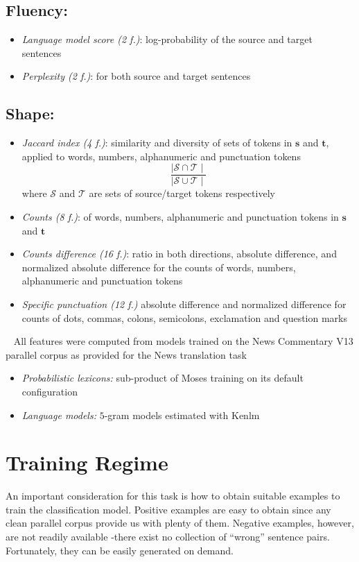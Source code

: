 \documentclass[a0]{sciposter}
\begin{document}
\begin{multicols*}{2}
\subsection*{Fluency:} 
\begin{itemize}
  \item \textit{Language model score (2 f.)}: log-probability of the source and target sentences
  \item \textit{Perplexity (2 f.)}: for both source and target sentences
\end{itemize}

\subsection*{Shape:}
\begin{itemize}
  \item \textit{Jaccard index (4 f.)}: similarity and diversity of sets of tokens in $\mathbf{s}$ and $\mathbf{t}$, applied to words, numbers, alphanumeric and punctuation tokens
  $$ \frac{\mid \mathcal{S}\cap \mathcal{T}\mid}{\mid \mathcal{S}\cup \mathcal{T}\mid}$$
  where $\mathcal{S}$ and $\mathcal{T}$ are sets of source/target tokens respectively
  \item \textit{Counts (8 f.)}: of words, numbers, alphanumeric and punctuation tokens in $\mathbf{s}$ and $\mathbf{t}$
  \item \textit{Counts difference (16 f.)}: ratio in both directions, absolute difference, and normalized absolute difference for the counts of words, numbers, alphanumeric and punctuation tokens
  \item \textit{Specific punctuation (12 f.)} absolute difference and normalized difference for counts of dots, commas, colons, semicolons, exclamation and question marks
\end{itemize}

~\newline
All features were computed from models trained on the News Commentary V13 parallel corpus as provided for the News translation task
\begin{itemize}
  \item \textit{Probabilistic lexicons:} sub-product of Moses training on its default configuration
  \item \textit{Language models:} $5$-gram models estimated with Kenlm
\end{itemize}


\section*{\Large Training Regime}
An important consideration for this task is how to obtain suitable examples to train the classification model. Positive examples are easy to obtain since any clean parallel corpus provide us with plenty of them. Negative examples, however, are not readily available -there exist no collection of ``wrong'' sentence pairs. Fortunately, they can be easily generated on demand. 


\end{multicols*}
\end{document}
